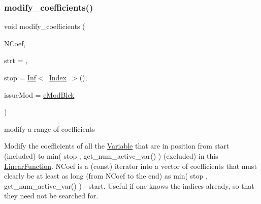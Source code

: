 \subsubsection{\texorpdfstring{modify\+\_\+coefficients()}{modify\_coefficients()}\hspace{0.1cm}{\footnotesize\ttfamily [3/4]}}
{\footnotesize\ttfamily void modify\+\_\+coefficients (\begin{DoxyParamCaption}\item[{\mbox{\hyperlink{class_s_m_spp__di__unipi__it_1_1_linear_function_a9e665512d3a7f7aae5031e99c675cc11}{c\+\_\+v\+\_\+coeff\+\_\+it}}}]{N\+Coef,  }\item[{\mbox{\hyperlink{group___thin_var_dep_interface___c_l_a_s_s_e_s_gaee6156e2ce80720d57a082d80f39d8cc}{c\+\_\+\+Index}}}]{strt = {},  }\item[{\mbox{\hyperlink{group___thin_var_dep_interface___c_l_a_s_s_e_s_gad53d6229d7ec28555a9c9c2fd9abf773}{Index}}}]{stop = {\ttfamily \mbox{\hyperlink{class_s_m_spp__di__unipi__it_1_1_inf}{Inf}}$<$~\mbox{\hyperlink{group___thin_var_dep_interface___c_l_a_s_s_e_s_gad53d6229d7ec28555a9c9c2fd9abf773}{Index}}~$>$()},  }\item[{\mbox{\hyperlink{group___modification___t_y_p_e_s_ga544246d8c462e9a2d817c2c30797968f}{c\+\_\+\+Mod\+Param}}}]{issue\+Mod = {\ttfamily \mbox{\hyperlink{group___modification___t_y_p_e_s_gga48fddcdd03a03f49b7e389ca1ed938d4a21b14b26b1c0093a0905f6fc010bad29}{e\+Mod\+Blck}}} }\end{DoxyParamCaption})}



modify a range of coefficients 

Modify the coefficients of all the \mbox{\hyperlink{class_s_m_spp__di__unipi__it_1_1_variable}{Variable}} that are in position from start (included) to min( stop , get\+\_\+num\+\_\+active\+\_\+var() ) (excluded) in this \mbox{\hyperlink{class_s_m_spp__di__unipi__it_1_1_linear_function}{Linear\+Function}}. N\+Coef is a (const) iterator into a vector of coefficients that must clearly be at least as long (from N\+Coef to the end) as min( stop , get\+\_\+num\+\_\+active\+\_\+var() ) -\/ start. Useful if one knows the indices already, so that they need not be searched for. \mbox{\label{class_s_m_spp__di__unipi__it_1_1_linear_function_a307bb1139542905caafd786ee0e823bf}} 
